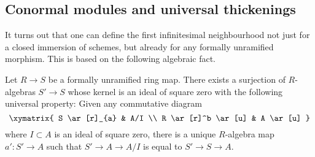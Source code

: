 \subsection{Conormal modules and universal thickenings}
\label{section-conormal}

It turns out that one can define the first infinitesimal neighbourhood
not just for a closed immersion of schemes, but already for any formally
unramified morphism. This is based on the following algebraic fact.

\begin{lemma}
\label{lemma-universal-thickening}
Let $R \to S$ be a formally unramified ring map. There exists a surjection of
$R$-algebras $S' \to S$ whose kernel is an ideal of square zero with the
following universal property: Given any commutative diagram
$$
\xymatrix{
S \ar[r]_{a} & A/I \\
R \ar[r]^b \ar[u] & A \ar[u]
}
$$
where $I \subset A$ is an ideal of square zero, there is a unique $R$-algebra
map $a' : S' \to A$ such that $S' \to A \to A/I$ is equal to $S' \to S \to A$.
\end{lemma}

